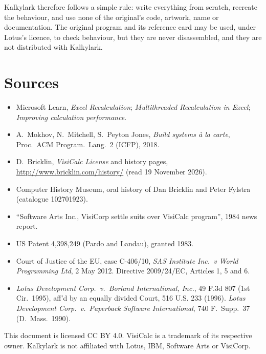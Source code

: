 \documentclass[11pt]{article}
\begin{document}
Kalkylark therefore follows a simple rule: write everything from scratch,
recreate the behaviour, and use none of the original's code, artwork, name
or documentation. The original program and its reference card may be used,
under Lotus's licence, to check behaviour, but they are never disassembled,
and they are not distributed with Kalkylark.

\section*{Sources}

\begin{small}
\begin{itemize}[leftmargin=1.2em, itemsep=2pt]
\item Microsoft Learn, \emph{Excel Recalculation}; \emph{Multithreaded
  Recalculation in Excel}; \emph{Improving calculation performance}.
\item A.~Mokhov, N.~Mitchell, S.~Peyton Jones, \emph{Build systems à la
  carte}, Proc.\ ACM Program.\ Lang.\ 2 (ICFP), 2018.
\item D.~Bricklin, \emph{VisiCalc License} and history pages,
  \url{http://www.bricklin.com/history/} (read 19 November 2026).
\item Computer History Museum, oral history of Dan Bricklin and Peter
  Fylstra (catalogue 102701923).
\item ``Software Arts Inc., VisiCorp settle suits over VisiCalc program'',
  1984 news report.
\item US Patent 4,398,249 (Pardo and Landau), granted 1983.
\item Court of Justice of the EU, case C-406/10, \emph{SAS Institute Inc.\
  v World Programming Ltd}, 2 May 2012. Directive 2009/24/EC, Articles 1,
  5 and 6.
\item \emph{Lotus Development Corp.\ v.\ Borland International, Inc.}, 49
  F.3d 807 (1st Cir.\ 1995), aff'd by an equally divided Court, 516 U.S.
  233 (1996). \emph{Lotus Development Corp.\ v.\ Paperback Software
  International}, 740 F.\ Supp.\ 37 (D.\ Mass.\ 1990).
\end{itemize}
\end{small}

\vfill
{\small This document is licensed CC BY 4.0. VisiCalc is a trademark of
its respective owner. Kalkylark is not affiliated with Lotus, IBM,
Software Arts or VisiCorp.}
\end{document}
